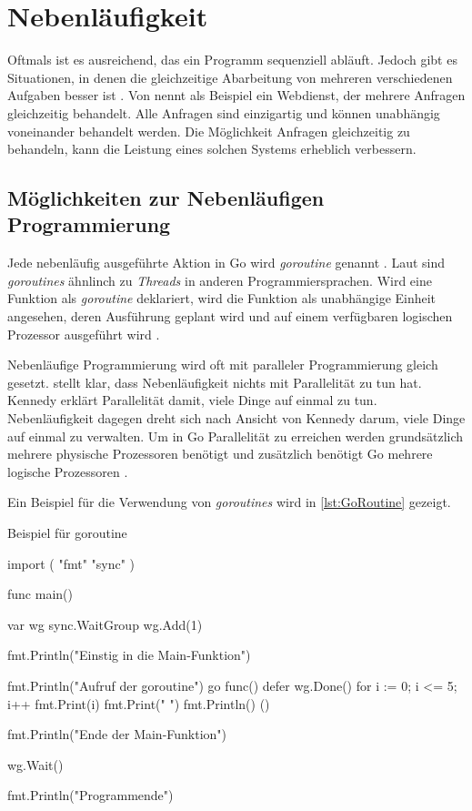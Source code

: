\chapter{Nebenläufigkeit}
Oftmals ist es ausreichend, das ein Programm sequenziell abläuft.
Jedoch gibt es Situationen, in denen die gleichzeitige Abarbeitung von mehreren verschiedenen Aufgaben besser ist \cite[S.128]{Kennedy.2016}.
Von \cite[S.128]{Kennedy.2016} nennt als Beispiel ein Webdienst, der mehrere Anfragen gleichzeitig behandelt.
Alle Anfragen sind einzigartig und können unabhängig voneinander behandelt werden.
Die Möglichkeit Anfragen gleichzeitig zu behandeln, kann die Leistung eines solchen Systems erheblich verbessern. 

\section{Möglichkeiten zur Nebenläufigen Programmierung}
Jede nebenläufig ausgeführte Aktion in Go wird \textit{goroutine} genannt \cite[S.352]{Donovan.2016}.
Laut \cite[S.352]{Donovan.2016} sind \textit{goroutines} ähnlinch zu \textit{Threads}  in anderen Programmiersprachen.
Wird eine Funktion als \textit{goroutine} deklariert, wird die Funktion als unabhängige Einheit angesehen, deren Ausführung geplant wird und auf einem verfügbaren logischen Prozessor ausgeführt wird \cite[S.128]{Kennedy.2016}.

Nebenläufige Programmierung wird oft mit paralleler Programmierung gleich gesetzt. 
\cite[S.131]{Kennedy.2016} stellt klar, dass Nebenläufigkeit nichts mit Parallelität zu tun hat.
Kennedy erklärt Parallelität damit, viele Dinge auf einmal zu tun.
Nebenläufigkeit dagegen dreht sich nach Ansicht von Kennedy darum, viele Dinge auf einmal zu verwalten.
Um in Go Parallelität zu erreichen werden grundsätzlich mehrere physische Prozessoren benötigt und zusätzlich benötigt Go mehrere logische Prozessoren \cite[S.131]{Kennedy.2016}.

Ein Beispiel für die Verwendung von \textit{goroutines} wird in \autoref{lst:GoRoutine} gezeigt.

\begin{listing}[H]
\caption{Beispiel für goroutine}
\label{lst:GoRoutine}
\begin{GoCode}
import (
    "fmt"
    "sync"
)

func main() {
    var wg sync.WaitGroup
    wg.Add(1)
    
    fmt.Println("Einstig in die Main-Funktion")
    
    fmt.Println("Aufruf der goroutine")
    go func() {
        defer wg.Done()
        for i := 0; i <= 5; i++ {
            fmt.Print(i)
            fmt.Print(" ")
        }
        fmt.Println()
    }()
    
    fmt.Println("Ende der Main-Funktion")
    
    wg.Wait()
    
    fmt.Println("Programmende")
}
\end{GoCode}
\end{listing}

